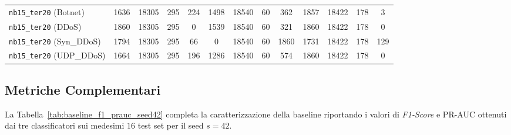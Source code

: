 \begin{table}[H]
{\begin{tabular}{lcccc|cccc|cccc}
        \texttt{nb15\_ter20} (Botnet) & 1636 & 18305 & 295 & 224 & 1498 & 18540 & 60 & 362 & 1857 & 18422 & 178 & 3 \\
        \texttt{nb15\_ter20} (DDoS) & 1860 & 18305 & 295 & 0 & 1539 & 18540 & 60 & 321 & 1860 & 18422 & 178 & 0 \\
        \texttt{nb15\_ter20} (Syn\_DDoS) & 1794 & 18305 & 295 & 66 & 0 & 18540 & 60 & 1860 & 1731 & 18422 & 178 & 129 \\
        \texttt{nb15\_ter20} (UDP\_DDoS) & 1664 & 18305 & 295 & 196 & 1286 & 18540 & 60 & 574 & 1860 & 18422 & 178 & 0 \\
        \bottomrule
    \end{tabular}
    }
\end{table}

\subsection{Metriche Complementari}

La Tabella~\ref{tab:baseline_f1_prauc_seed42} completa la caratterizzazione della baseline riportando i valori di \textit{F1-Score} e PR-AUC ottenuti dai tre classificatori sui medesimi $16$ test set per il seed $s=42$.


